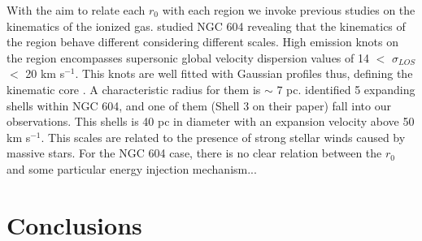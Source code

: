 \documentclass[fleqn,usenatbib, useAMS, a4paper]{mnras}
\begin{document}
With the aim to relate each \(r_0\) with each region we invoke previous studies on the kinematics of the ionized gas. 
\citet{sabalisck1995supersonic} studied NGC 604 revealing that the kinematics of the region behave different considering different scales.
High emission knots on the region encompasses supersonic global velocity dispersion values of 14 $<$ \(\sigma_{LOS}\) $<$ 20 km s\(^{-1}\).
This knots are well fitted with Gaussian profiles thus, defining the kinematic core \citep{munoz1996}.
A characteristic radius for them is \(\sim\) 7 pc.
\citet{yang1996} identified 5 expanding shells within NGC 604, and one of them (Shell 3 on their paper) fall into our observations.
This shells is 40 pc in diameter with an expansion velocity above 50 km s\(^{-1}\).
This scales are related to the presence of strong stellar winds caused by massive stars.
For the NGC 604 case, there is no clear relation between the \(r_0\) and some particular energy injection mechanism...



\section{Conclusions}\label{sec:conclusions}

    
    

    
\end{document}
